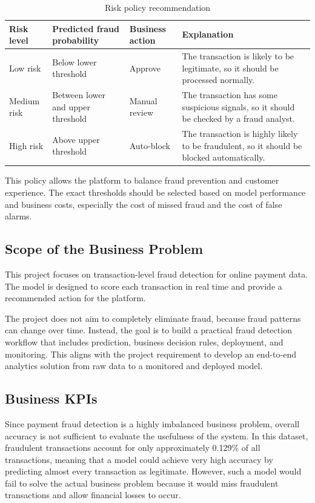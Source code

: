 \begin{table}[h]
  \centering
  \caption{Risk policy recommendation}
  \label{tab:risk_policy}
  \begin{tabularx}{\textwidth}{p{3cm} p{4cm} p{3cm} X}
    \toprule
    \textbf{Risk level} &
    \textbf{Predicted fraud probability} &
    \textbf{Business action} &
    \textbf{Explanation} \\
    \midrule

    Low risk &
    Below lower threshold &
    Approve &
    The transaction is likely to be legitimate, so it should be processed normally. \\

    \midrule

    Medium risk &
    Between lower and upper threshold &
    Manual review &
    The transaction has some suspicious signals, so it should be checked by a fraud analyst. \\

    \midrule

    High risk &
    Above upper threshold &
    Auto-block &
    The transaction is highly likely to be fraudulent, so it should be blocked automatically. \\

    \bottomrule
  \end{tabularx}
\end{table}

This policy allows the platform to balance fraud prevention and customer experience. The exact thresholds should be selected based on model performance and business costs, especially the cost of missed fraud and the cost of false alarms.

\subsection{Scope of the Business Problem}
This project focuses on transaction-level fraud detection for online payment data. The model is designed to score each transaction in real time and provide a recommended action for the platform.

The project does not aim to completely eliminate fraud, because fraud patterns can change over time. Instead, the goal is to build a practical fraud detection workflow that includes prediction, business decision rules, deployment, and monitoring. This aligns with the project requirement to develop an end-to-end analytics solution from raw data to a monitored and deployed model.

\subsection{Business KPIs}
Since payment fraud detection is a highly imbalanced business problem, overall accuracy is not sufficient to evaluate the usefulness of the system. In this dataset, fraudulent transactions account for only approximately 0.129\% of all transactions, meaning that a model could achieve very high accuracy by predicting almost every transaction as legitimate. However, such a model would fail to solve the actual business problem because it would miss fraudulent transactions and allow financial losses to occur.

